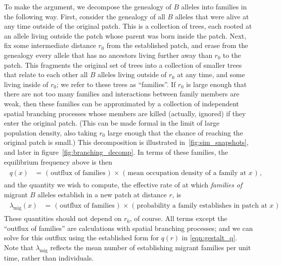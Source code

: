\documentclass{article}
\newcommand{\migrate}{\lambda_\text{mig}}
\begin{document}
To make the argument, we decompose the genealogy of $B$ alleles into families in the following way.
First, consider the genealogy of all $B$ alleles that were alive at any time outside of the original patch.  
This is a collection of trees, each rooted at an allele living outside the patch whose parent was born inside the patch.
Next, fix some intermediate distance $r_0$ from the established patch,
and erase from the genealogy every allele that has no ancestors living further away than $r_0$ to the patch.
This fragments the original set of trees into a collection of smaller trees that relate to each other all $B$ alleles living outside of $r_0$ at any time,
and some living inside of $r_0$;
we refer to these trees as ``families''.
If $r_0$ is large enough that there are not too many families
and interactions between family members are weak,
then these families can be approximated by a collection of independent spatial branching processes
whose members are killed (actually, ignored) if they enter the original patch.
(This can be made formal in the limit of large population density, also taking $r_0$ large enough that the chance of reaching the original patch is small.)
This decomposition is illustrated in~\ref{fig:sim_snapshots}, and later in figure~\ref{fig:branching_decomp}.
In terms of these families, the equilibrium frequency above is then
\begin{align}
    \label{eqn:gestalt_q}
    \begin{split}
        q(x) &= \text{ ( outflux of families ) } \times \text{ ( mean occupation density of a family at $x$ ) } ,
\end{split}
\end{align}
and the quantity we wish to compute,
the effective rate of at which \emph{families of} migrant $B$ alleles establish in a new patch at distance $r$, 
is
\begin{align}
    \label{eqn:gestalt_migrate}
    \begin{split}
        \migrate(x) &= \text{ ( outflux of families ) } \times \text{ ( probability a family establishes in patch at $x$ ) }
    \end{split}
\end{align}
These quantities should not depend on $r_0$, of course.
All terms except the ``outflux of families'' are calculations with spatial branching processes;
and we can solve for this outflux using the established form for $q(r)$ in \eqref{eqn:gestalt_q}.
Note that $\migrate$ reflects the mean number of establishing migrant families per unit time,  rather than individuals.
\end{document}
